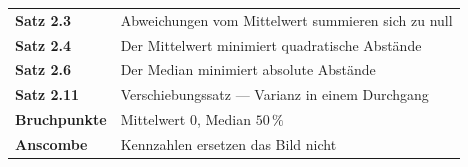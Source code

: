 \begin{merksatz}
\begin{center}
\renewcommand{\arraystretch}{1.5}
\begin{tabular}{@{}P{3.0cm}P{5.6cm}@{}}
\toprule
\textbf{Satz 2.3} & Abweichungen vom Mittelwert summieren sich zu null\\
\textbf{Satz 2.4} & Der Mittelwert minimiert quadratische Abstände\\
\textbf{Satz 2.6} & Der Median minimiert absolute Abstände\\
\textbf{Satz 2.11} & Verschiebungssatz --- Varianz in einem Durchgang\\
\textbf{Bruchpunkte} & Mittelwert $0$, Median $50\,\%$\\
\textbf{Anscombe} & Kennzahlen ersetzen das Bild nicht\\
\bottomrule
\end{tabular}
\end{center}

\begin{center}
\begin{minipage}{0.88\textwidth}
\end{minipage}
\end{center}
\end{merksatz}
